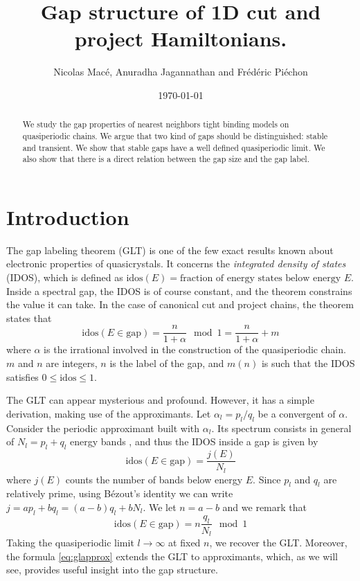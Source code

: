 \documentclass[a4paper]{jpconf}
\newcommand{\id}{\ensuremath{\text{idos}}}
\begin{document}
\title{Gap structure of 1D cut and project Hamiltonians.}
\author{Nicolas Macé, Anuradha Jagannathan and Frédéric Piéchon}
\address{Laboratoire de Physique des Solides, Université Paris-Saclay, 91400 Orsay, France}


\date{\today}

\begin{abstract}
We study the gap properties of nearest neighbors tight binding models on quasiperiodic chains.
We argue that two kind of gaps should be distinguished: stable and transient.
We show that stable gaps have a well defined quasiperiodic limit. 
We also show that there is a direct relation between the gap size and the gap label.
\end{abstract}


\section*{Introduction}

The gap labeling theorem (GLT) \cite{bellissard} is one of the few exact results known about electronic properties of quasicrystals.
It concerns the \emph{integrated density of states} (IDOS), which is defined as $\id(E) = \text{fraction of energy states below energy~}E$.
Inside a spectral gap, the IDOS is of course constant, and the theorem constrains the value it can take.
In the case of canonical cut and project chains, the theorem states that
\begin{equation}
\label{eq:gl}
	\id(E \in \text{gap}) = \frac{n}{1+\alpha} \mod 1 = \frac{n}{1+\alpha} + m
\end{equation}
where $\alpha$ is the irrational involved in the construction of the quasiperiodic chain. 
$m$ and $n$ are integers, $n$ is the label of the gap, and $m(n)$ is such that the IDOS satisfies $0 \leq \id \leq  1$.

The GLT can appear mysterious and profound. However, it has a simple derivation, making use of the approximants.
Let $\alpha_l = p_l/q_l$ be a convergent of $\alpha$. 
Consider the periodic approximant built with $\alpha_l$.
Its spectrum consists in general of $N_l = p_l + q_l$ energy bands \cite{diffractionLuck, codimSire}, and thus the IDOS inside a gap is given by
\begin{equation}
	\id(E \in \text{gap}) = \frac{j(E)}{N_l}
\end{equation}
where $j(E)$ counts the number of bands below energy $E$.
Since $p_l$ and $q_l$ are relatively prime, using Bézout's identity we can write $j = a p_l + b q_l = (a-b) q_l + b N_l$.
We let $n = a-b$ and we remark that
\begin{equation}
\label{eq:glapprox}
	\id(E \in \text{gap}) = n \frac{q_l}{N_l} \mod 1
\end{equation}
Taking the quasiperiodic limit $l \to \infty$ at fixed $n$, we recover the GLT.
Moreover, the formula \eqref{eq:glapprox} extends the GLT to approximants, which, as we will see, provides useful insight into the gap structure.
\end{document}
